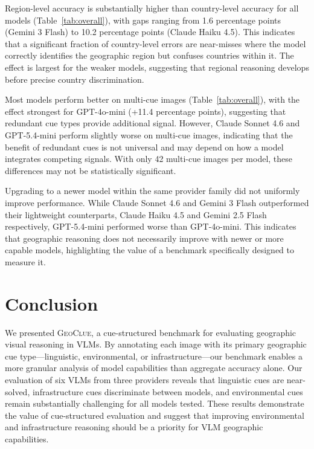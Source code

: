 \documentclass[twoside,11pt]{article}
\newcommand{\benchmark}{\textsc{GeoClue}}
\begin{document}
Region-level accuracy is substantially higher than country-level accuracy for all models (Table~\ref{tab:overall}), with gaps ranging from 1.6 percentage points (Gemini 3 Flash) to 10.2 percentage points (Claude Haiku 4.5). This indicates that a significant fraction of country-level errors are near-misses where the model correctly identifies the geographic region but confuses countries within it. The effect is largest for the weaker models, suggesting that regional reasoning develops before precise country discrimination.

Most models perform better on multi-cue images (Table~\ref{tab:overall}), with the effect strongest for GPT-4o-mini (+11.4 percentage points), suggesting that redundant cue types provide additional signal. However, Claude Sonnet 4.6 and GPT-5.4-mini perform slightly worse on multi-cue images, indicating that the benefit of redundant cues is not universal and may depend on how a model integrates competing signals. With only 42 multi-cue images per model, these differences may not be statistically significant.

Upgrading to a newer model within the same provider family did not uniformly improve performance. While Claude Sonnet 4.6 and Gemini 3 Flash outperformed their lightweight counterparts, Claude Haiku 4.5 and Gemini 2.5 Flash respectively, GPT-5.4-mini performed worse than GPT-4o-mini. This indicates that geographic reasoning does not necessarily improve with newer or more capable models, highlighting the value of a benchmark specifically designed to measure it.

\section{Conclusion}
\label{sec:conclusion}

We presented \benchmark{}, a cue-structured benchmark for evaluating geographic visual reasoning in VLMs. By annotating each image with its primary geographic cue type---linguistic, environmental, or infrastructure---our benchmark enables a more granular analysis of model capabilities than aggregate accuracy alone. Our evaluation of six VLMs from three providers reveals that linguistic cues are near-solved, infrastructure cues discriminate between models, and environmental cues remain substantially challenging for all models tested. These results demonstrate the value of cue-structured evaluation and suggest that improving environmental and infrastructure reasoning should be a priority for VLM geographic capabilities.
\end{document}
